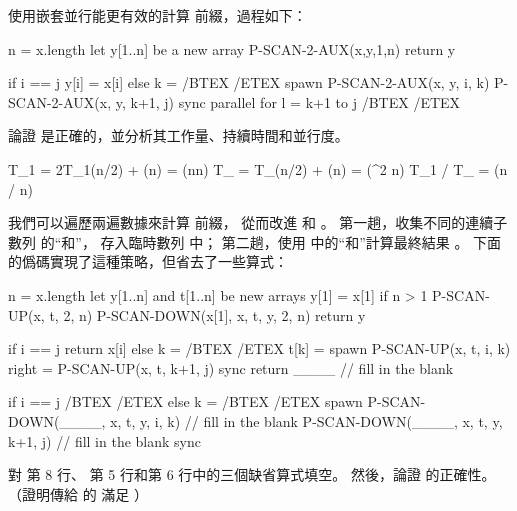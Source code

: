 使用嵌套並行能更有效的計算 \m{\otimes} 前綴，過程如下：

\startCLRS
n = x.length
let y[1..n] be a new array
P-SCAN-2-AUX(x,y,1,n)
return y
\stopCLRS

\startCLRS
if i == j
	y[i] = x[i]
else
	k = /BTEX  /ETEX
	spawn P-SCAN-2-AUX(x, y, i, k)
	P-SCAN-2-AUX(x, y, k+1, j)
	sync
	parallel for l = k+1 to j
		/BTEX  /ETEX
\stopCLRS

\startigBase[continue]\startitem
論證  是正確的，並分析其工作量、持續時間和並行度。
\stopitem\stopigBase

\startANSWER
\startformula\startmathalignment
\NC T_1 \NC = 2T_1(n/2) + \Theta(n) = \Theta(n\lg n) \NR
\NC T_{\infty} \NC = T_{\infty}(n/2) + \Theta(\lg n) = \Theta(\lg^2 n) \NR
\NC T_1 / T_{\infty} \NC = \Theta(n / \lg n) \NR
\stopmathalignment\stopformula
\stopANSWER

我們可以遍歷兩遍數據來計算 \m{\otimes} 前綴，
從而改進  和 。
第一趟，收集不同的連續子數列  的“和”，
存入臨時數列  中；
第二趟，使用  中的“和”計算最終結果 。
下面的僞碼實現了這種策略，但省去了一些算式：

\startCLRS
n = x.length
let y[1..n] and t[1..n] be new arrays
y[1] = x[1]
if n > 1
	P-SCAN-UP(x, t, 2, n)
	P-SCAN-DOWN(x[1], x, t, y, 2, n)
return y
\stopCLRS

\startCLRS
if i == j
	return x[i]
else
	k = /BTEX  /ETEX
	t[k] = spawn P-SCAN-UP(x, t, i, k)
	right = P-SCAN-UP(x, t, k+1, j)
	sync
	return ____		// fill in the blank
\stopCLRS

\startCLRS
if i == j
	/BTEX  /ETEX
else
	k = /BTEX /ETEX
	spawn P-SCAN-DOWN(____, x, t, y, i, k)		// fill in the blank
	P-SCAN-DOWN(____, x, t, y, k+1, j)		// fill in the blank
	sync
\stopCLRS

\startigBase[continue]\startitem
對  第 8 行、  第 5 行和第 6 行中的三個缺省算式填空。
然後，論證  的正確性。
（\hint 證明傳給  的  滿足 ）
\stopitem\stopigBase

\startANSWER
{}


